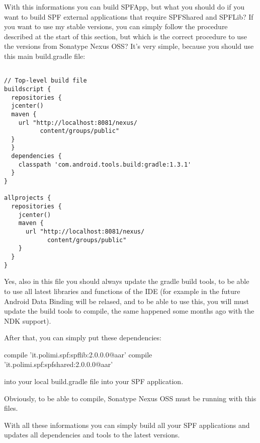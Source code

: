 With this informations you can build SPFApp, but what you should do if you want to build SPF external applications that require SPFShared and SPFLib?
If you want to use my stable versions, you can simply follow the procedure described at the start of this section, but which is the correct procedure to use the versions from Sonatype Nexus OSS?
It's very simple, because you should use this main build.gradle file:

\begin{lstlisting}
	
// Top-level build file
buildscript {
  repositories {
  jcenter()
  maven {
    url "http://localhost:8081/nexus/
    	  content/groups/public"
  }
  }
  dependencies {
    classpath 'com.android.tools.build:gradle:1.3.1'
  }
}

allprojects {
  repositories {
    jcenter()
    maven {
      url "http://localhost:8081/nexus/
      		content/groups/public"
    }
  }
}
\end{lstlisting}

Yes, also in this file you should always update the gradle build tools, to be able to use all latest libraries and functions of the IDE (for example in the future Android Data Binding will be relased, and to be able to use this, you will must update the build tools to compile, the same happened some months ago with the NDK support).

After that, you can simply put these dependencies:

compile 'it.polimi.spf:spflib:2.0.0.0@aar'
compile 'it.polimi.spf:spfshared:2.0.0.0@aar'


into your local build.gradle file into your SPF application.

Obviously, to be able to compile, Sonatype Nexus OSS must be running with this files. 

With all these informations you can simply build all your SPF applications and updates all dependencies and tools to the latest versions.



